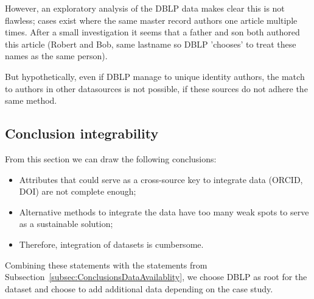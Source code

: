 \documentclass{ou-report}
\newcommand{\doi}{{DOI}}
\newcommand{\dblp}{DBLP}
\newcommand{\orcid}{ORCID}
\begin{document}
However, an exploratory analysis of the DBLP data makes clear this is not 
flawless; cases exist where the same master record authors one 
article multiple times. After a small investigation it seems that a father 
and son both authored this article (Robert and Bob, same lastname so DBLP 
'chooses' to treat these names as the same person).

But hypothetically, even if \dblp{} manage to unique identity authors, 
the match to authors in other datasources is not possible, if these sources 
do not adhere the same method.




\subsection{Conclusion integrability}
From this section we can draw the following conclusions:
\begin{itemize}
    \item Attributes that could serve as a cross-source key to integrate data 
    (\orcid{}, \doi{}) are not complete enough;
    \item Alternative methods to integrate the data have too many weak spots to
    serve as a sustainable solution;
    \item Therefore, integration of datasets is cumbersome.
\end{itemize}

Combining these statements with the statements from 
Subsection~\ref{subsec:ConclusionsDataAvailablity}, we choose \dblp{} as root 
for the dataset and choose to add additional data depending on the case study.
\end{document}
